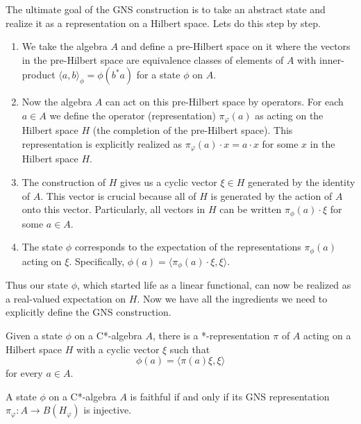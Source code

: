 The ultimate goal of the GNS construction is to take an abstract state
and realize it as a representation on a Hilbert space. Lets do this step by step.
\begin{enumerate}
    \item We take the algebra $A$ and define a pre-Hilbert space on it where the vectors
    in the pre-Hilbert space are equivalence classes of elements of $A$ with inner-product
    $\langle a, b \rangle_\phi = \phi(b^*a)$ for a state $\phi$ on $A$.
    \item Now the algebra $A$ can act on this pre-Hilbert space by operators. For
    each $a \in A$ we define the operator (representation) $\pi_\varphi (a)$ as acting
    on the Hilbert space $H$ (the completion of the pre-Hilbert space). This representation
    is explicitly realized as $\pi_\varphi(a) \cdot x = a \cdot x$ for some $x$ in
    the Hilbert space $H$.
    \item The construction of $H$ gives us a cyclic vector $\xi \in H$ generated by
    the identity of $A$. This vector is crucial because all of $H$ is generated
    by the action of $A$ onto this vector. Particularly, all vectors in $H$ can
    be written $\pi_\phi(a) \cdot \xi$ for some $a \in A$.
    \item The state $\phi$ corresponds to the expectation of the representations
    $\pi_\phi(a)$ acting on $\xi$. Specifically, $\phi(a) = \langle \pi_\phi(a) \cdot \xi, \xi \rangle$.
\end{enumerate}
Thus our state $\phi$, which started life as a linear functional, can now be realized
as a real-valued expectation on $H$. Now we have all the ingredients we need to
explicitly define the GNS construction.

\begin{theorem}
    Given a state $\phi$ on a C*-algebra $A$, there is a *-representation $\pi$ of $A$ acting
    on a Hilbert space $H$ with a cyclic vector $\xi$ such that
    \begin{equation*}
        \phi(a) = \langle \pi(a)\xi , \xi \rangle
    \end{equation*}
    for every $a \in A$.
\end{theorem}

\begin{theorem}
    A state $\phi$ on a C*-algebra $A$ is faithful if and only if its GNS representation
    $\pi_\varphi: A \to B(H_\varphi)$ is injective.
\end{theorem}


